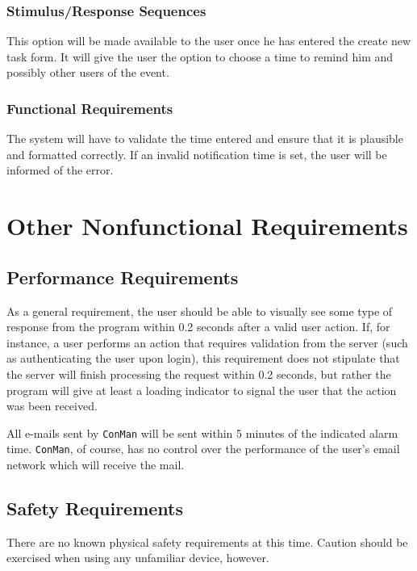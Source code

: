 \documentclass{article}
\begin{document}
\subsubsection{Stimulus/Response Sequences}
This option will be made available to the user once he has entered the create new task form. 
It will give the user the option to choose a time to remind him and possibly other users of the event. 
 
\subsubsection{Functional Requirements}
The system will have to validate the time entered and ensure that it is plausible and formatted correctly.  If an invalid notification time is set, the user will be informed of the error. 

\newpage
\section{Other Nonfunctional Requirements}
\subsection{Performance Requirements}
As a general requirement, the user should be able to visually see some type of response from the program within 0.2 seconds after a valid user action.  
If, for instance, a user performs an action that requires validation from the server (such as authenticating the user upon login), this requirement does not stipulate that the server will finish processing the request within 0.2 seconds, but rather the program will give at least a loading indicator to signal the user that the action was been received.

All e-mails sent by \texttt{ConMan} will be sent within 5 minutes of the indicated alarm time.
\texttt{ConMan}, of course, has no control over the performance of the user's email network which will receive the mail.


\subsection{Safety Requirements}
There are no known physical safety requirements at this time.  Caution should be exercised when using any unfamiliar device, however.\\
\end{document}
